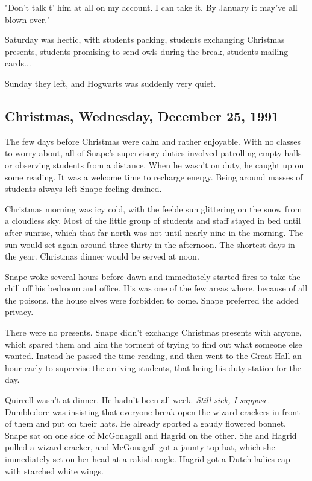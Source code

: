 \documentclass[a4paper,11pt]{article}
\begin{document}
"Don't talk t' him at all on my account. I can take it. By January it may've all blown over."

Saturday was hectic, with students packing, students exchanging Christmas presents, students promising to send owls during the break, students mailing cards...

Sunday they left, and Hogwarts was suddenly very quiet.

\subsection{Christmas, Wednesday, December 25, 1991}

The few days before Christmas were calm and rather enjoyable. With no classes to worry about, all of Snape's supervisory duties involved patrolling empty halls or observing students from a distance. When he wasn't on duty, he caught up on some reading. It was a welcome time to recharge energy. Being around masses of students always left Snape feeling drained.

Christmas morning was icy cold, with the feeble sun glittering on the snow from a cloudless sky. Most of the little group of students and staff stayed in bed until after sunrise, which that far north was not until nearly nine in the morning. The sun would set again around three-thirty in the afternoon. The shortest days in the year. Christmas dinner would be served at noon.

Snape woke several hours before dawn and immediately started fires to take the chill off his bedroom and office. His was one of the few areas where, because of all the poisons, the house elves were forbidden to come. Snape preferred the added privacy.

There were no presents. Snape didn't exchange Christmas presents with anyone, which spared them and him the torment of trying to find out what someone else wanted. Instead he passed the time reading, and then went to the Great Hall an hour early to supervise the arriving students, that being his duty station for the day.

Quirrell wasn't at dinner. He hadn't been all week. \emph{Still sick, I suppose.} Dumbledore was insisting that everyone break open the wizard crackers in front of them and put on their hats. He already sported a gaudy flowered bonnet. Snape sat on one side of McGonagall and Hagrid on the other. She and Hagrid pulled a wizard cracker, and McGonagall got a jaunty top hat, which she immediately set on her head at a rakish angle. Hagrid got a Dutch ladies cap with starched white wings.
\end{document}

